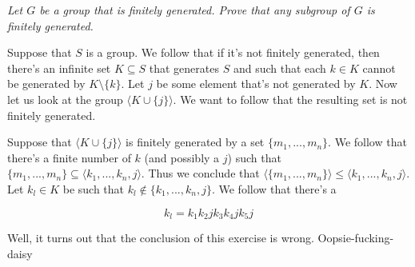 \documentclass[11pt,oneside,titlepage]{book}
\newcommand{\eangle}[1]{\langle #1 \rangle}
\newcommand{\set}[1]{\{ #1 \}}
\begin{document}
\textit{Let $G$ be a group that is finitely generated. Prove that any subgroup of $G$ is finitely
  generated.}

Suppose that $S$ is a group. We follow that if it's not finitely generated, then there's an
infinite set $K \subseteq S$ that generates $S$ and such that each $k \in K$ cannot be generated
by $K \setminus \set{k}$. Let $j$ be some element that's not generated by $K$. Now let us
look at the group $\eangle{K \cup \set{j}}$. We want to follow that the resulting set is not
finitely generated. 

Suppose that $\eangle{K \cup \set{j}}$ is finitely generated by a set
$\set{m_1, ..., m_n}$. We follow that there's a finite number of $k$ (and possibly a $j$)
such that $\set{m_1, ..., m_n} \subseteq \eangle{k_1, ..., k_n, j}$. Thus we conclude that
$\eangle{\set{m_1, ..., m_n}} \leq \eangle{k_1, ..., k_n, j}$. Let $k_l \in K$ be such that
$k_l \notin \set{k_1, ..., k_n, j}$. We follow that there's a

$$k_l = k_1 k_2 j k_3 k_4 j k_5 j$$

Well, it turns out that the conclusion of this exercise is wrong. Oopsie-fucking-daisy
\end{document}
